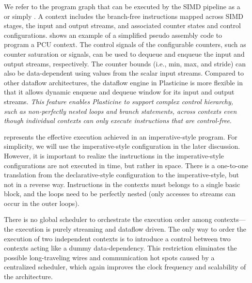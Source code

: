 We refer to the program graph that can be executed by the SIMD pipeline as a  or
simply . 
A context includes the branch-free instructions mapped across SIMD stages, the input and output streams, and associated counter states and control configurations.
 shows an example of a simplified pseudo assembly code to program a PCU context.
The control signals of the configurable counters, such as counter saturation or 
signals, can be used to dequeue and enqueue the input and output streams, respectively.
The counter bounds (i.e., min, max, and stride) can also be data-dependent using values from the scalar input streams. Compared to other dataflow architectures, the dataflow engine in Plasticine is more flexible in that it allows dynamic enqueue and dequeue window for its input and output streams.
\emph{This feature enables Plasticine to support complex control hierarchy, such as non-perfectly nested loops and
branch statements, across contexts even though individual contexts can only execute instructions that are
control-free}. 

 represents the effective execution achieved in an imperative-style program.
For simplicity, we will use the imperative-style configuration in the later discussion.
However, it is important to realize the instructions in the imperative-style configurations are not
executed in time, but rather in space.
There is a one-to-one translation from the declarative-style configuration to the imperative-style, but not in a reverse way.
Instructions in the contexts must belongs to a single basic block, and the loops need to be
perfectly nested (only accesses to streams can occur in the outer loops).

There is no global scheduler to orchestrate the execution order among contexts---the execution is purely
streaming and dataflow driven. 
The only way to order the execution of two independent contexts is to introduce a control  between two contexts acting like a dummy data-dependency.
This restriction eliminates the possible long-traveling wires and communication hot spots caused by a
centralized scheduler, which again improves the clock frequency and scalability of the architecture.

